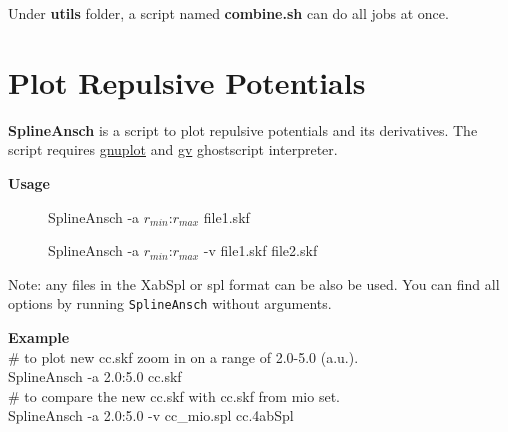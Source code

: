 Under \textbf{utils} folder, a script named \textbf{combine.sh} can do all
jobs at once.

\section{Plot Repulsive Potentials}

\textbf{SplineAnsch} is a script to plot repulsive potentials and its
derivatives.  The script requires \href{http://www.gnuplot.info/}{gnuplot}
and \href{https://www.gnu.org/software/gv/}{gv} ghostscript interpreter.  

\textbf{Usage}
\begin{description}
  \item[]  SplineAnsch -a $r_{min}$:$r_{max}$ file1.skf
  \item[]  SplineAnsch -a $r_{min}$:$r_{max}$ -v file1.skf file2.skf
\end{description} 

Note: any files in the XabSpl or spl format can be also be used.
You can find all options by running \texttt{SplineAnsch} without arguments. 

\textbf{Example}\\ 
{\scriptsize
\noindent\# to plot new cc.skf zoom in on a range of 2.0-5.0 (a.u.).\\
SplineAnsch -a 2.0:5.0 cc.skf \\

\noindent\# to compare the new cc.skf with cc.skf from mio set.\\ 
SplineAnsch -a 2.0:5.0 -v cc\_mio.spl cc.4abSpl \\

}


